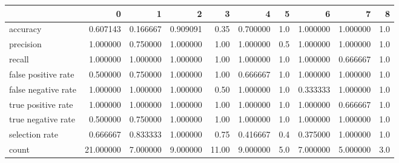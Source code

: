 \begin{tabular}{lrrrrrrrrr}
\toprule
{} &          0 &         1 &         2 &      3 &         4 &    5 &         6 &         7 &    8 \\
\midrule
accuracy            &   0.607143 &  0.166667 &  0.909091 &   0.35 &  0.700000 &  1.0 &  1.000000 &  1.000000 &  1.0 \\
precision           &   1.000000 &  0.750000 &  1.000000 &   1.00 &  1.000000 &  0.5 &  1.000000 &  1.000000 &  1.0 \\
recall              &   1.000000 &  1.000000 &  1.000000 &   1.00 &  1.000000 &  1.0 &  1.000000 &  0.666667 &  1.0 \\
false positive rate &   0.500000 &  0.750000 &  1.000000 &   1.00 &  0.666667 &  1.0 &  1.000000 &  1.000000 &  1.0 \\
false negative rate &   1.000000 &  1.000000 &  1.000000 &   0.50 &  1.000000 &  1.0 &  0.333333 &  1.000000 &  1.0 \\
true positive rate  &   1.000000 &  1.000000 &  1.000000 &   1.00 &  1.000000 &  1.0 &  1.000000 &  0.666667 &  1.0 \\
true negative rate  &   0.500000 &  0.750000 &  1.000000 &   1.00 &  1.000000 &  1.0 &  1.000000 &  1.000000 &  1.0 \\
selection rate      &   0.666667 &  0.833333 &  1.000000 &   0.75 &  0.416667 &  0.4 &  0.375000 &  1.000000 &  1.0 \\
count               &  21.000000 &  7.000000 &  9.000000 &  11.00 &  9.000000 &  5.0 &  7.000000 &  5.000000 &  3.0 \\
\bottomrule
\end{tabular}

